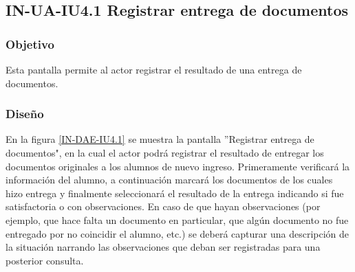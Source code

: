\subsection{IN-UA-IU4.1 Registrar entrega de documentos}

\subsubsection{Objetivo}
	
	Esta pantalla permite al actor registrar el resultado de una entrega de documentos.

\subsubsection{Diseño}

    En la figura \ref{IN-DAE-IU4.1} se muestra la pantalla ''Registrar entrega de documentos", en la cual el actor podrá registrar el resultado de entregar los documentos originales a los alumnos de nuevo ingreso. Primeramente verificará la información del alumno, a continuación marcará los documentos de los cuales hizo entrega y finalmente seleccionará el resultado de la entrega indicando si fue satisfactoria o con observaciones. En caso de que hayan observaciones (por ejemplo, que hace falta un documento en particular, que algún documento no fue entregado por no coincidir el alumno, etc.) se deberá capturar una descripción de la situación narrando las observaciones que deban ser registradas para una posterior consulta.
            
